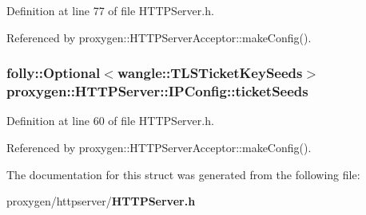 Definition at line 77 of file H\+T\+T\+P\+Server.\+h.



Referenced by proxygen\+::\+H\+T\+T\+P\+Server\+Acceptor\+::make\+Config().

\subsubsection[{ticket\+Seeds}]{\setlength{\rightskip}{0pt plus 5cm}folly\+::\+Optional$<$wangle\+::\+T\+L\+S\+Ticket\+Key\+Seeds$>$ proxygen\+::\+H\+T\+T\+P\+Server\+::\+I\+P\+Config\+::ticket\+Seeds}\label{structproxygen_1_1HTTPServer_1_1IPConfig_a00185c7f6376d571cffd41210af89574}


Definition at line 60 of file H\+T\+T\+P\+Server.\+h.



Referenced by proxygen\+::\+H\+T\+T\+P\+Server\+Acceptor\+::make\+Config().



The documentation for this struct was generated from the following file\+:\begin{DoxyCompactItemize}
\item 
proxygen/httpserver/{\bf H\+T\+T\+P\+Server.\+h}\end{DoxyCompactItemize}
